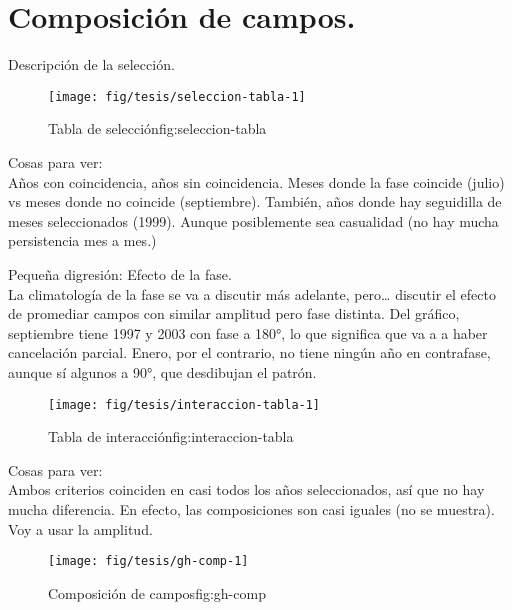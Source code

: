 \documentclass[spanish,a4paper]{book}
\begin{document}
\section{Composición de campos.}\label{composicion-de-campos.}

Descripción de la selección.

\begin{figure}

{\centering \texttt{[image: fig/tesis/seleccion-tabla-1]} 

}

\caption{Tabla de selección{fig:seleccion-tabla}}\label{fig:seleccion-tabla}
\end{figure}

Cosas para ver:\\
Años con coincidencia, años sin coincidencia. Meses donde la fase
coincide (julio) vs meses donde no coincide (septiembre). También, años
donde hay seguidilla de meses seleccionados (1999). Aunque posiblemente
sea casualidad (no hay mucha persistencia mes a mes.)

Pequeña digresión: Efecto de la fase.\\
La climatología de la fase se va a discutir más adelante, pero\ldots{}
discutir el efecto de promediar campos con similar amplitud pero fase
distinta. Del gráfico, septiembre tiene 1997 y 2003 con fase a 180°, lo
que significa que va a a haber cancelación parcial. Enero, por el
contrario, no tiene ningún año en contrafase, aunque sí algunos a 90°,
que desdibujan el patrón.

\begin{figure}

{\centering \texttt{[image: fig/tesis/interaccion-tabla-1]} 

}

\caption{Tabla de interacción{fig:interaccion-tabla}}\label{fig:interaccion-tabla}
\end{figure}

Cosas para ver:\\
Ambos criterios coinciden en casi todos los años seleccionados, así que
no hay mucha diferencia. En efecto, las composiciones son casi iguales
(no se muestra). Voy a usar la amplitud.

\begin{figure}

{\centering \texttt{[image: fig/tesis/gh-comp-1]} 

}

\caption{Composición de campos{fig:gh-comp}}\label{fig:gh-comp}
\end{figure}
\end{document}
